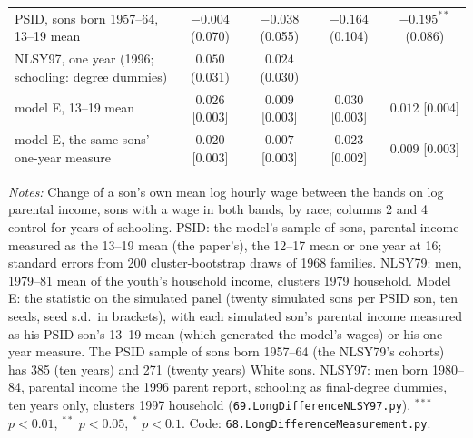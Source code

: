 \begin{table}[!htbp]
{\begin{tabular}{lcccc}
\quad PSID, sons born 1957--64, 13--19 mean & $-0.004$ (0.070) & $-0.038$ (0.055) & $-0.164$ (0.104) & $-0.195^{**}$ (0.086) \\
\quad NLSY97, one year (1996; schooling: degree dummies) & $0.050$ (0.031) & $0.024$ (0.030) &  &  \\
\quad model E, 13--19 mean & $0.026$ [0.003] & $0.009$ [0.003] & $0.030$ [0.003] & $0.012$ [0.004] \\
\quad model E, the same sons' one-year measure & $0.020$ [0.003] & $0.007$ [0.003] & $0.023$ [0.002] & $0.009$ [0.003] \\
\bottomrule
\end{tabular}}
\par\smallskip
\begin{minipage}{\textwidth}\footnotesize \textit{Notes:} Change of a son's own mean log hourly wage between the bands on log parental income, sons with a wage in both bands, by race; columns 2 and 4 control for years of schooling. PSID: the model's sample of sons, parental income measured as the 13--19 mean (the paper's), the 12--17 mean or one year at 16; standard errors from 200 cluster-bootstrap draws of 1968 families. NLSY79: men, 1979--81 mean of the youth's household income, clusters 1979 household. Model E: the statistic on the simulated panel (twenty simulated sons per PSID son, ten seeds, seed s.d.\ in brackets), with each simulated son's parental income measured as his PSID son's 13--19 mean (which generated the model's wages) or his one-year measure. The PSID sample of sons born 1957--64 (the NLSY79's cohorts) has 385 (ten years) and 271 (twenty years) White sons. NLSY97: men born 1980--84, parental income the 1996 parent report, schooling as final-degree dummies, ten years only, clusters 1997 household (\texttt{69.LongDifferenceNLSY97.py}). $^{***}$ $p<0.01$, $^{**}$ $p<0.05$, $^{*}$ $p<0.1$. Code: \texttt{68.LongDifferenceMeasurement.py}.\end{minipage}
\end{table}
